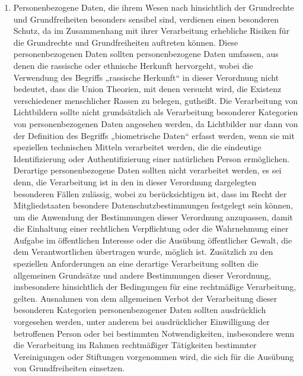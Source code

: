 \begin{enumerate}
   \item Personenbezogene Daten, die ihrem Wesen nach hinsichtlich der Grundrechte und Grundfreiheiten besonders
    sensibel sind, verdienen einen besonderen Schutz, da im Zusammenhang mit ihrer Verarbeitung erhebliche Risiken für
    die Grundrechte und Grundfreiheiten auftreten können. Diese personenbezogenen Daten sollten personenbezogene Daten
    umfassen, aus denen die rassische oder ethnische Herkunft hervorgeht, wobei die Verwendung des Begriffs „rassische
    Herkunft“ in dieser Verordnung nicht bedeutet, dass die Union Theorien, mit denen versucht wird, die Existenz
    verschiedener menschlicher Rassen zu belegen, gutheißt. Die Verarbeitung von Lichtbildern sollte nicht
    grundsätzlich als Verarbeitung besonderer Kategorien von personenbezogenen Daten angesehen werden, da Lichtbilder
    nur dann von der Definition des Begriffs „biometrische Daten“ erfasst werden, wenn sie mit speziellen technischen
    Mitteln verarbeitet werden, die die eindeutige Identifizierung oder Authentifizierung einer natürlichen Person
    ermöglichen. Derartige personenbezogene Daten sollten nicht verarbeitet werden, es sei denn, die Verarbeitung ist
    in den in dieser Verordnung dargelegten besonderen Fällen zulässig, wobei zu berücksichtigen ist, dass im Recht der
    Mitgliedstaaten besondere Datenschutzbestimmungen festgelegt sein können, um die Anwendung der Bestimmungen dieser
    Verordnung anzupassen, damit die Einhaltung einer rechtlichen Verpflichtung oder die Wahrnehmung einer Aufgabe im
    öffentlichen Interesse oder die Ausübung öffentlicher Gewalt, die dem Verantwortlichen übertragen wurde, möglich
    ist. Zusätzlich zu den speziellen Anforderungen an eine derartige Verarbeitung sollten die allgemeinen Grundsätze
    und andere Bestimmungen dieser Verordnung, insbesondere hinsichtlich der Bedingungen für eine rechtmäßige
    Verarbeitung, gelten. Ausnahmen von dem allgemeinen Verbot der Verarbeitung dieser besonderen Kategorien
    personenbezogener Daten sollten ausdrücklich vorgesehen werden, unter anderem bei ausdrücklicher Einwilligung der
    betroffenen Person oder bei bestimmten Notwendigkeiten, insbesondere wenn die Verarbeitung im Rahmen rechtmäßiger
    Tätigkeiten bestimmter Vereinigungen oder Stiftungen vorgenommen wird, die sich für die Ausübung von
    Grundfreiheiten einsetzen.%
   \label{eg:51}
   


\end{enumerate}
